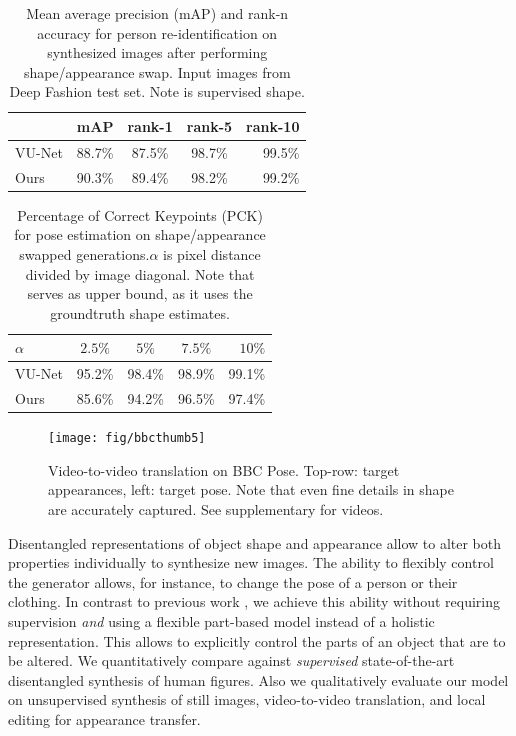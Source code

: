 	\begin{table}
		\centering
		\caption{Mean average precision (mAP) and rank-n accuracy for person re-identification on synthesized images after performing shape/appearance swap. Input images from Deep Fashion test set. Note \cite{esser18} is supervised \wrt shape.}
		\label{tab:reid}
		\begin{tabular}{l|cccr}
			\hline
			& mAP & rank-1 & rank-5 & rank-10 \\ \hline
			VU-Net \cite{esser18} & 88.7\% & 87.5\% & {98.7}\% & {99.5}\% \\
			Ours & {90.3}\% & {89.4}\% &{98.2}\% & {99.2}\% \\ \hline
		\end{tabular}
	\end{table}
	\begin{table}
		\centering
		\caption{Percentage of Correct Keypoints (PCK) for pose estimation on shape/appearance swapped generations.\;$\alpha$ is pixel distance divided by image diagonal. Note that \cite{esser18} serves as upper bound, as it uses the groundtruth shape estimates.}
		\label{tab:pose}
		\begin{tabular}{l|cccr}
			\hline
			$\alpha$ & $2.5\%$ &  $5\%$ & $7.5\%$ & $10\%$ \\ \hline
			VU-Net \cite{esser18} & {95.2}\% & {98.4}\% & {98.9}\% & {99.1}\% \\
			Ours & 85.6\% & 94.2\% &96.5\% & 97.4\% \\ \hline
		\end{tabular}
	\end{table}


	\begin{figure}[t]
		\centering
		\texttt{[image: fig/bbcthumb5]}
		\caption{Video-to-video translation on BBC Pose. Top-row: target appearances, left: target pose.
		Note that even fine details in shape are accurately captured. See supplementary for videos.}
		\label{fig:bbcthumb}
	\end{figure}

	Disentangled representations of object shape and appearance allow to alter both properties individually to synthesize new images. The ability to flexibly control the generator allows, for instance, to change the pose of a person or their clothing. In contrast to previous work \cite{esser18, denton17disvideo, ma17poseguided, ma17disperson, debem18dgpose, jakab18},
	we achieve this ability without requiring supervision \textit{and} using a flexible part-based model instead of a holistic representation. This allows to explicitly control the parts of an object that are to be altered. We quantitatively compare against \emph{supervised} state-of-the-art disentangled synthesis of human figures. Also we qualitatively evaluate our model on unsupervised synthesis of still images, video-to-video translation, and local editing for appearance transfer.

